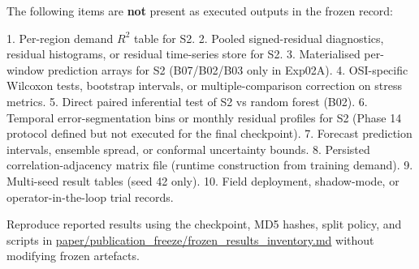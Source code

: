 The following items are \textbf{not} present as executed outputs in the frozen record:

1. Per-region demand $R^2$ table for S2.
2. Pooled signed-residual diagnostics, residual histograms, or residual time-series store for S2.
3. Materialised per-window prediction arrays for S2 (B07/B02/B03 only in Exp02A).
4. OSI-specific Wilcoxon tests, bootstrap intervals, or multiple-comparison correction on stress metrics.
5. Direct paired inferential test of S2 vs random forest (B02).
6. Temporal error-segmentation bins or monthly residual profiles for S2 (Phase 14 protocol defined but not executed for the final checkpoint).
7. Forecast prediction intervals, ensemble spread, or conformal uncertainty bounds.
8. Persisted correlation-adjacency matrix file (runtime construction from training demand).
9. Multi-seed result tables (seed 42 only).
10. Field deployment, shadow-mode, or operator-in-the-loop trial records.

Reproduce reported results using the checkpoint, MD5 hashes, split policy, and scripts in \url{paper/publication_freeze/frozen_results_inventory.md} without modifying frozen artefacts.

